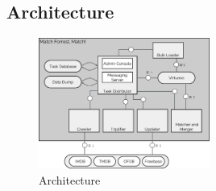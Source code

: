\subsection{Architecture}
\label{subsec_method_architecture}

\begin{figure}[ht]
  \begin{center}
  \includegraphics[width=0.5\textwidth]{images/architecture.pdf}
  \end{center}
  \caption{Architecture}
  \label{fig_architecture}
\end{figure}